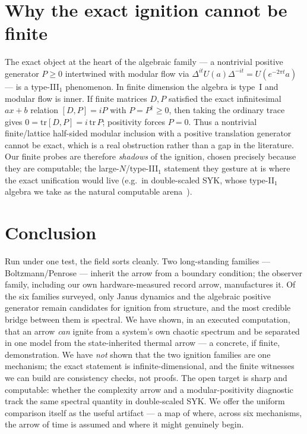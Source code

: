 \documentclass[11pt]{article}
\newcommand{\Pgen}{P}
\begin{document}
\section{Why the exact ignition cannot be finite}

The exact object at the heart of the algebraic family --- a nontrivial positive generator
$\Pgen\ge 0$ intertwined with modular flow via $\Delta^{it}U(a)\Delta^{-it} =
U(e^{-2\pi t}a)$ --- is a type-III$_1$ phenomenon. In finite dimension the algebra
is type~I and modular flow is inner. If finite matrices $D,\Pgen$ satisfied the
exact infinitesimal $ax{+}b$ relation $[D,\Pgen]=i\Pgen$ with
$\Pgen=\Pgen^\dagger\ge0$, then taking the ordinary trace gives
$0=\mathrm{tr}[D,\Pgen]=i\,\mathrm{tr}\,\Pgen$; positivity forces
$\Pgen=0$. Thus a nontrivial finite/lattice half-sided modular inclusion with a
positive translation generator cannot be exact, which is a real obstruction
rather than a gap in the literature. Our
finite probes are therefore \emph{shadows} of the ignition, chosen precisely
because they are computable; the large-$N$/type-III$_1$ statement they gesture at
is where the exact unification would live (e.g.~in double-scaled SYK, whose
type-II$_1$ algebra we take as the natural computable arena~\cite{dssyk}).

\section{Conclusion}

Run under one test, the field sorts cleanly. Two long-standing families ---
Boltzmann/Penrose --- inherit the arrow from a boundary condition; the observer
family, including our own hardware-measured record arrow, manufactures it. Of
the six families surveyed, only Janus dynamics and the algebraic positive
generator remain candidates for ignition from structure, and the most credible bridge between them is spectral.
We have shown,
in an executed computation, that an arrow \emph{can} ignite from a system's own
chaotic spectrum and be separated in one model from the state-inherited thermal
arrow --- a concrete, if finite, demonstration. We have \emph{not} shown that the
two ignition families are one mechanism; the exact statement is
infinite-dimensional, and the finite witnesses we can build are consistency
checks, not proofs. The open target is sharp and computable: whether the
complexity arrow and a modular-positivity diagnostic track the same spectral
quantity in double-scaled SYK. We offer the uniform comparison itself as the
useful artifact --- a map of where, across six mechanisms, the arrow of time is
assumed and where it might genuinely begin.
\end{document}
